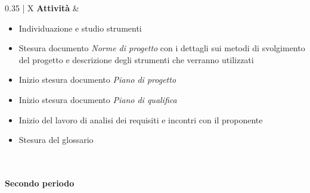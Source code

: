 \begin{xltabular}{\textwidth}{{0.35\textwidth} | X}
    \textbf{Attività} 
    & \begin{itemize}
        \item Individuazione e studio strumenti
        \item Stesura documento \textit{Norme di progetto} con i dettagli sui metodi di svolgimento del progetto e descrizione degli strumenti che verranno utilizzati
        \item Inizio stesura documento \textit{Piano di progetto}
        \item Inizio stesura documento \textit{Piano di qualifica}
        \item Inizio del lavoro di analisi dei requisiti e incontri con il proponente
        \item Stesura del glossario
    \end{itemize} \\
    \hline

\caption{Tabella descrittiva del periodo 1 della fase di analisi}\label{tab:periodo1_1}
\end{xltabular}

\newpage
\paragraph{Secondo periodo}\label{sec:pianificazione:analisi:periodi:secondo}

